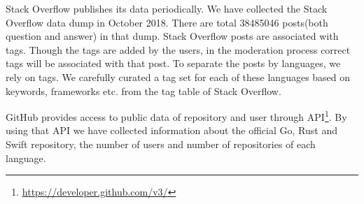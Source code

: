  
 
 Stack Overflow publishes its data periodically. We have collected the Stack Overflow data dump in  October 2018. There are total 38485046 posts(both question and answer) in that dump. Stack Overflow posts are associated with tags. Though the tags are added by the users, in the moderation process correct tags will be associated with that post. To separate the posts by languages, we rely on tags. We carefully curated a tag set for each of these languages based on keywords, frameworks etc. from the tag table of Stack Overflow.

GitHub provides access to public data of repository and user through API\footnote{\url{https://developer.github.com/v3/}}. By using that API we have collected information about the official Go, Rust and Swift repository, the number of users and number of repositories of each language.
\fi